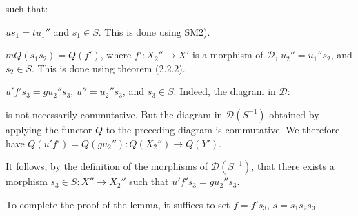 \clearpage
{}%
\begingroup
\small
\setlength{\parskip}{0pt}%
\setlength{\emergencystretch}{1.5em}%
\setlength{\abovedisplayskip}{1pt plus 1pt minus 1pt}%
\setlength{\belowdisplayskip}{1pt plus 1pt minus 1pt}%

\noindent such that:

\par\noindent{}$us_1=tu_1''$ and $s_1\in S$.
This is done using SM2).

\par\noindent{}$mQ(s_1s_2)=Q(f')$, where
$f'\colon X_2''\longrightarrow X'$ is a morphism of $\mathcal D$,
$u_2''=u_1''s_2$, and $s_2\in S$. This is done using theorem (2.2.2).

\par\noindent{}$u'f's_3=gu_2''s_3$,
$u''=u_2''s_3$, and $s_3\in S$. Indeed, the diagram in $\mathcal D$:

\begin{center}
\end{center}

\noindent is not necessarily commutative. But the diagram in
$\mathcal D(S^{-1})$ obtained by applying the functor $Q$ to the preceding
diagram is commutative. We therefore have
$Q(u'f')=Q(gu_2'')\colon Q(X_2'')\longrightarrow Q(Y')$.

It follows, by the definition of the morphisms of $\mathcal D(S^{-1})$,
that there exists a morphism
$s_3\in S\colon X''\longrightarrow X_2''$ such that
$u'f's_3=gu_2''s_3$.

To complete the proof of the lemma, it suffices to set
$f=f's_3$, $s=s_1s_2s_3$.

